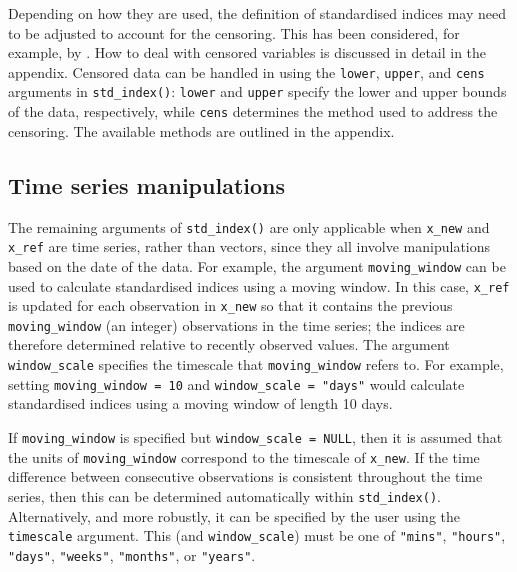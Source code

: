 Depending on how they are used, the definition of standardised indices may need to be adjusted to account for the censoring. This has been considered, for example, by \cite{StaggeEtAl2015}. How to deal with censored variables is discussed in detail in the appendix. Censored data can be handled in  using the \texttt{lower}, \texttt{upper}, and \texttt{cens} arguments in \texttt{std\_index()}: \texttt{lower} and \texttt{upper} specify the lower and upper bounds of the data, respectively, while \texttt{cens} determines the method used to address the censoring. The available methods are outlined in the appendix.

\subsection{Time series manipulations}\label{time-series-manipulations}

The remaining arguments of \texttt{std\_index()} are only applicable when \texttt{x\_new} and \texttt{x\_ref} are time series, rather than vectors, since they all involve manipulations based on the date of the data. For example, the argument \texttt{moving\_window} can be used to calculate standardised indices using a moving window. In this case, \texttt{x\_ref} is updated for each observation in \texttt{x\_new} so that it contains the previous \texttt{moving\_window} (an integer) observations in the time series; the indices are therefore determined relative to recently observed values. The argument \texttt{window\_scale} specifies the timescale that \texttt{moving\_window} refers to. For example, setting \texttt{moving\_window\ =\ 10} and \texttt{window\_scale\ =\ "days"} would calculate standardised indices using a moving window of length 10 days.

If \texttt{moving\_window} is specified but \texttt{window\_scale\ =\ NULL}, then it is assumed that the units of \texttt{moving\_window} correspond to the timescale of \texttt{x\_new}. If the time difference between consecutive observations is consistent throughout the time series, then this can be determined automatically within \texttt{std\_index()}. Alternatively, and more robustly, it can be specified by the user using the \texttt{timescale} argument. This (and \texttt{window\_scale}) must be one of \texttt{"mins"}, \texttt{"hours"}, \texttt{"days"}, \texttt{"weeks"}, \texttt{"months"}, or \texttt{"years"}.

